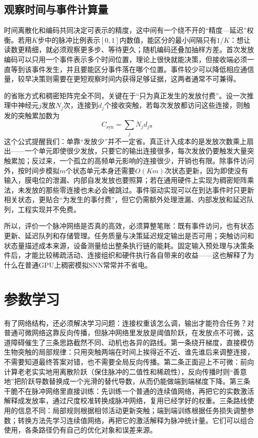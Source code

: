 \subsection{观察时间与事件计算量}
\label{sec:snn-cost}

时间离散化和编码共同决定可表示的精度，这中间有一个绕不开的“精度—延迟”权衡。若用$K$步中的脉冲比例表示$[0,1]$内数值，能区分的最小间隔只有$1/K$：想让读数更精细，就必须观察更多步、等待更久；随机编码还叠加抽样方差。首次发放编码可以只用一个事件表示多个时间位置，理论上很快就能决策，但接收端必须一直等到该事件发生，并且要能区分事件落在哪个位置。事件较少可以降低相应通信量，较早决策则需要在更短观察时间内获得足够证据，这两者通常不可兼得。

的省账方式和稠密矩阵完全不同，关键在于“只为真正发生的发放付费”。设一次推理中神经元$j$发放$N_j$次，连接到$d_j$个接收突触，若每次发放都访问这些连接，则触发的突触累加数为
\begin{equation}
  C_{\mathrm{syn}}=\sum_jN_jd_j\text{。}
  \label{eq:snn-event-cost}
\end{equation}
这个公式提醒我们：单靠“发放少”并不一定省。真正计入成本的是发放次数乘上扇出——一个单元即使很少发放，只要它的输出连接很多，每次发放仍要触发大量突触累加；反过来，一个孤立的高频单元影响的连接很少，开销也有限。除事件访问外，按时间步模拟$m$个状态单元本身还需要$O(Km)$次状态更新，因为即使没有输入，膜电位的泄漏、内部自发发放也要照算；若在通用硬件上实现为稠密矩阵乘法，未发放的那些零连接也未必会被跳过。事件驱动实现可以在到达事件时只更新相关状态，更贴合“为发生的事付费”，但它仍需额外处理泄漏、内部发放和延迟队列，工程实现并不免费。

所以，评价一个脉冲网络是否真的高效，必须算整笔账：既有事件访问，也有状态更新、延迟队列和存储管理。任务质量与决策延迟规定输出是否可用；突触访问和状态量描述成本来源，设备测量给出整条执行链的能耗。固定输入预处理与决策条件后，才能比较稀疏活动、连接组织和硬件执行各自带来的收益——这也解释了为什么在普通GPU上稠密模拟SNN常常并不省电。



\section{参数学习}
\label{sec:snn-learning}

有了网络结构，还必须解决学习问题：连接权重该怎么调，输出才能符合任务？对普通可微网络这靠反向传播，但脉冲网络里发放是阈值阶跃，在发放点不可微，这道障碍催生了三条思路截然不同、动机也各异的路线。第一条绕开梯度，直接模仿生物突触的局部规律：只用突触两端在时间上挨得近不近、谁先谁后来调整连接，不需要知道最终答案对错，也不需要全局反向传播。第二条正面迎上不可微：前向计算老老实实地用离散阶跃（保住脉冲的二值性和稀疏性），反向传播时则“善意地”把阶跃导数替换成一个光滑的替代导数，从而仍能做端到端梯度下降。第三条干脆不在脉冲网络里直接训练：先训练一个普通的连续值网络，再把它的实数激活解释成发放率，通过尺度校准转换成脉冲网络，复用已经学好的权重。三条路线使用的信息不同：局部规则根据相邻活动更新突触；端到端训练根据任务损失调整参数；转换方法先学习连续值网络，再把它的激活解释为脉冲统计量。它们可以组合使用，各条路径仍有自己的优化对象和误差来源。

